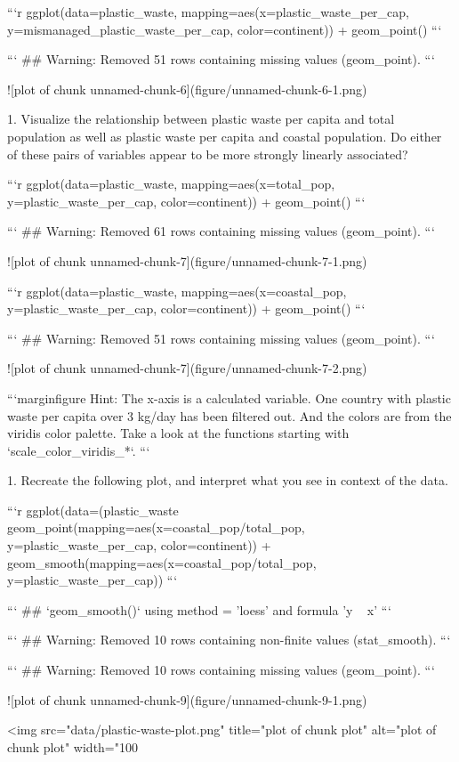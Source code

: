 ```r
ggplot(data=plastic_waste,
       mapping=aes(x=plastic_waste_per_cap, 
                   y=mismanaged_plastic_waste_per_cap,
                   color=continent)) +
  geom_point()
```

```
## Warning: Removed 51 rows containing missing values (geom_point).
```

![plot of chunk unnamed-chunk-6](figure/unnamed-chunk-6-1.png)


1. Visualize the relationship between plastic waste per capita and total population as well as plastic waste per capita and coastal population. Do either of these pairs of variables appear to be more strongly linearly associated?


```r
ggplot(data=plastic_waste,
       mapping=aes(x=total_pop,
                   y=plastic_waste_per_cap,
                   color=continent)) +
  geom_point()
```

```
## Warning: Removed 61 rows containing missing values (geom_point).
```

![plot of chunk unnamed-chunk-7](figure/unnamed-chunk-7-1.png)

```r
ggplot(data=plastic_waste,
       mapping=aes(x=coastal_pop,
                   y=plastic_waste_per_cap,
                   color=continent)) + 
  geom_point()
```

```
## Warning: Removed 51 rows containing missing values (geom_point).
```

![plot of chunk unnamed-chunk-7](figure/unnamed-chunk-7-2.png)



```marginfigure
Hint: The x-axis is a calculated variable. One country with plastic waste per capita over 3 kg/day has been filtered out. And the colors are from the viridis color palette. Take a look at the functions starting with `scale_color_viridis_*`.
```

1. Recreate the following plot, and interpret what you see in context of the data.


```r
ggplot(data=(plastic_waste %
  geom_point(mapping=aes(x=coastal_pop/total_pop,
                   y=plastic_waste_per_cap,
                   color=continent)) + 
  geom_smooth(mapping=aes(x=coastal_pop/total_pop,
                   y=plastic_waste_per_cap))
```

```
## `geom_smooth()` using method = 'loess' and formula 'y ~ x'
```

```
## Warning: Removed 10 rows containing non-finite values (stat_smooth).
```

```
## Warning: Removed 10 rows containing missing values (geom_point).
```

![plot of chunk unnamed-chunk-9](figure/unnamed-chunk-9-1.png)


<img src="data/plastic-waste-plot.png" title="plot of chunk plot" alt="plot of chunk plot" width="100%
